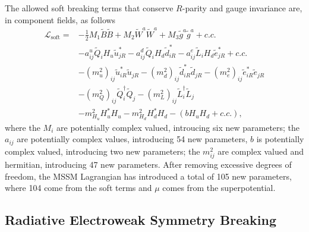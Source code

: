\documentclass[twoside,english]{uiofysmaster}
\begin{document}
{The allowed soft breaking terms that conserve $R$-parity and gauge invariance are, in component fields, as follows
\begin{align}\label{Eq:: phys back : MSSM soft terms}
\mathcal{L}_{\text{soft}} =& - \frac{1}{2} M_1 \widetilde{B} \widetilde{B} + M_2 \widetilde{W}^a \widetilde{W}^a + M_3 \widetilde{g}^a \widetilde{g}^a + c.c. \nonumber \\
&- a_{ij}^u \widetilde{Q}_i H_u \widetilde{u}_{jR}^* - a_{ij}^d \widetilde{Q}_i H_d \widetilde{d}_{iR}^* - a_{ij}^e \widetilde{L}_i H_d \widetilde{e}_{jR}^* + c.c. \nonumber \\
& -(m_u^2)_{ij} \widetilde{u}_{iR}^* \widetilde{u}_{jR} - (m_d^2)_{ij} \widetilde{d}_{iR}^* \widetilde{d}_{jR} - (m_e^2)_{ij} \widetilde{e}_{iR}^* \widetilde{e}_{jR} \nonumber \\
& - (m_Q^2)_{ij} \widetilde{Q}_i^{\dagger} \widetilde{Q}_j - (m_L^2)_{ij} \widetilde{L}_i^{\dagger} \widetilde{L}_j \nonumber \\
& - m_{H_u}^2 H_u^*H_u - m_{H_d}^2 H_d^* H_d - (b H_u H_d + c.c.),
\end{align}
where the $M_i$ are potentially complex valued, introucing six new parameters; the $a_{ij}$ are potentially complex values, introducing 54 new parameters, $b$ is potentially complex valued, introducing two new parameters; the $m_{ij}^2$ are complex valued and hermitian, introducing 47 new parameters. After removing excessive degrees of freedom, the MSSM Lagrangian has introduced a total of 105 new parameters, where 104 come from the soft terms and $\mu$ comes from the superpotential.


\subsection{Radiative Electroweak Symmetry Breaking}

}
\end{document}
